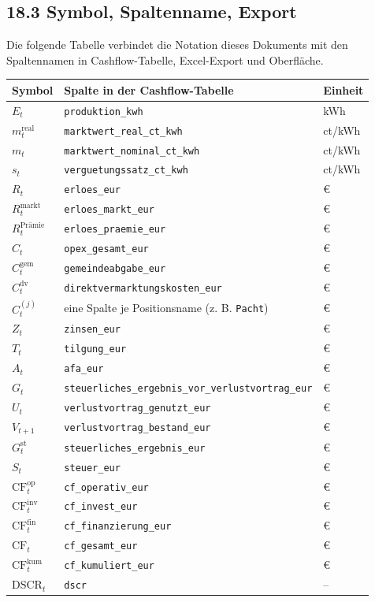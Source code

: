 \documentclass[
  a4paper,
  10pt]{article}
\begin{document}
\hypertarget{symbol-spaltenname-export}{%
\subsection{18.3 Symbol, Spaltenname,
Export}\label{symbol-spaltenname-export}}

Die folgende Tabelle verbindet die Notation dieses Dokuments mit den
Spaltennamen in Cashflow-Tabelle, Excel-Export und Oberfläche.

\begin{longtable}[]{@{}lll@{}}
\toprule\noalign{}
Symbol & Spalte in der Cashflow-Tabelle & Einheit \\
\midrule\noalign{}
\endhead
\bottomrule\noalign{}
\endlastfoot
\(E_t\) & \texttt{produktion\_kwh} & kWh \\
\(m^{\mathrm{real}}_t\) & \texttt{marktwert\_real\_ct\_kwh} & ct/kWh \\
\(m_t\) & \texttt{marktwert\_nominal\_ct\_kwh} & ct/kWh \\
\(s_t\) & \texttt{verguetungssatz\_ct\_kwh} & ct/kWh \\
\(R_t\) & \texttt{erloes\_eur} & € \\
\(R^{\mathrm{markt}}_t\) & \texttt{erloes\_markt\_eur} & € \\
\(R^{\text{Prämie}}_t\) & \texttt{erloes\_praemie\_eur} & € \\
\(C_t\) & \texttt{opex\_gesamt\_eur} & € \\
\(C^{\mathrm{gem}}_t\) & \texttt{gemeindeabgabe\_eur} & € \\
\(C^{\mathrm{dv}}_t\) & \texttt{direktvermarktungskosten\_eur} & € \\
\(C^{(j)}_t\) & eine Spalte je Positionsname (z. B. \texttt{Pacht}) &
€ \\
\(Z_t\) & \texttt{zinsen\_eur} & € \\
\(T_t\) & \texttt{tilgung\_eur} & € \\
\(A_t\) & \texttt{afa\_eur} & € \\
\(G_t\) & \texttt{steuerliches\_ergebnis\_vor\_verlustvortrag\_eur} &
€ \\
\(U_t\) & \texttt{verlustvortrag\_genutzt\_eur} & € \\
\(V_{t+1}\) & \texttt{verlustvortrag\_bestand\_eur} & € \\
\(G^{\mathrm{st}}_t\) & \texttt{steuerliches\_ergebnis\_eur} & € \\
\(S_t\) & \texttt{steuer\_eur} & € \\
\(\mathrm{CF}^{\mathrm{op}}_t\) & \texttt{cf\_operativ\_eur} & € \\
\(\mathrm{CF}^{\mathrm{inv}}_t\) & \texttt{cf\_invest\_eur} & € \\
\(\mathrm{CF}^{\mathrm{fin}}_t\) & \texttt{cf\_finanzierung\_eur} & € \\
\(\mathrm{CF}_t\) & \texttt{cf\_gesamt\_eur} & € \\
\(\mathrm{CF}^{\mathrm{kum}}_t\) & \texttt{cf\_kumuliert\_eur} & € \\
\(\mathrm{DSCR}_t\) & \texttt{dscr} & -- \\
\end{longtable}
\end{document}

